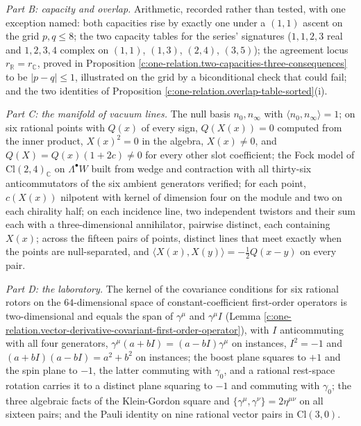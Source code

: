 \documentclass[11pt]{article}
\theoremstyle{definition}
\theoremstyle{plain}
\providecommand{\C}{}\renewcommand{\C}{\mathbb{C}}
\providecommand{\Cl}{}\renewcommand{\Cl}{\mathrm{Cl}}
\providecommand{\R}{}\renewcommand{\R}{\mathbb{R}}
\providecommand{\ip}{}\renewcommand{\ip}[2]{\langle #1, #2\rangle}
\begin{document}
\emph{Part B: capacity and overlap.} Arithmetic, recorded rather than tested, with one exception named: both capacities rise by exactly one under a $(1,1)$ ascent on the grid $p, q \leq 8$; the two capacity tables for the series' signatures ($1,1,2,3$ real and $1,2,3,4$ complex on $(1,1)$, $(1,3)$, $(2,4)$, $(3,5)$); the agreement locus $r_{\R} = r_{\C}$, proved in Proposition \ref{c:one-relation.two-capacities-three-consequences} to be $|p - q| \leq 1$, illustrated on the grid by a biconditional check that could fail; and the two identities of Proposition \ref{c:one-relation.overlap-table-sorted}(i).

\emph{Part C: the manifold of vacuum lines.} The null basis $n_{0}, n_{\infty}$ with $\ip{n_{0}}{n_{\infty}} = 1$; on six rational points with $Q(x)$ of every sign, $Q(X(x)) = 0$ computed from the inner product, $X(x)^{2} = 0$ in the algebra, $X(x) \neq 0$, and $Q(X) = Q(x)(1+2c) \neq 0$ for every other slot coefficient; the Fock model of $\Cl(2,4)_{\C}$ on $\Lambda^{\bullet}W$ built from wedge and contraction with all thirty-six anticommutators of the six ambient generators verified; for each point, $c(X(x))$ nilpotent with kernel of dimension four on the module and two on each chirality half; on each incidence line, two independent twistors and their sum each with a three-dimensional annihilator, pairwise distinct, each containing $X(x)$; across the fifteen pairs of points, distinct lines that meet exactly when the points are null-separated, and $\ip{X(x)}{X(y)} = -\tfrac12 Q(x-y)$ on every pair.

\emph{Part D: the laboratory.} The kernel of the covariance conditions for six rational rotors on the $64$-dimensional space of constant-coefficient first-order operators is two-dimensional and equals the span of $\gamma^{\mu}$ and $\gamma^{\mu}I$ (Lemma \ref{c:one-relation.vector-derivative-covariant-first-order-operator}), with $I$ anticommuting with all four generators, $\gamma^{\mu}(a+bI) = (a-bI)\gamma^{\mu}$ on instances, $I^{2} = -1$ and $(a+bI)(a-bI) = a^{2} + b^{2}$ on instances; the boost plane squares to $+1$ and the spin plane to $-1$, the latter commuting with $\gamma_{0}$, and a rational rest-space rotation carries it to a distinct plane squaring to $-1$ and commuting with $\gamma_{0}$; the three algebraic facts of the Klein-Gordon square and $\{\gamma^{\mu}, \gamma^{\nu}\} = 2\eta^{\mu\nu}$ on all sixteen pairs; and the Pauli identity on nine rational vector pairs in $\Cl(3,0)$.
\end{document}
